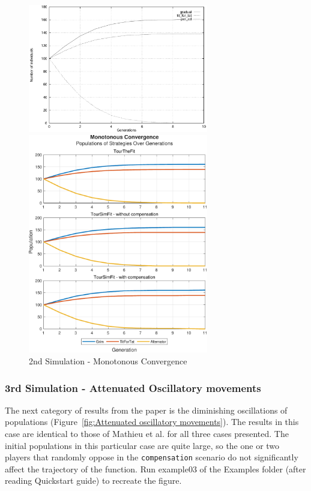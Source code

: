 \documentclass[12pt]{article}
\begin{document}
	\begin{figure}[h]
	    \centering
		\includegraphics[width=0.7\textwidth]{RefPaperFigures/fig2.jpeg}\par\vspace{0.5em}
	    \includegraphics[width=0.7\textwidth]{Monotonous Convergence.pdf}
	    \caption{2nd Simulation - Monotonous Convergence}
	    \label{fig:Monotonous Convergence}
	\end{figure}
\subsubsection{3rd Simulation - Attenuated Oscillatory movements}
The next category of results from the paper is the diminishing oscillations of populations (Figure~\ref{fig:Attenuated oscillatory movements}). The results in this case are identical to those of Mathieu et al. for all three cases presented. The initial populations in this particular case are quite large, so the one or two players that randomly oppose in the \texttt{compensation} scenario do not significantly affect the trajectory of the function. Run example03 of the Examples folder (after reading Quickstart guide) to recreate the figure.
\end{document}
